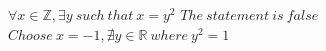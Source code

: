 \documentclass{article}
\begin{document}
$\forall x \in \mathbb{Z}, \exists y\ such\ that\ x = y^2$
$The\ statement\ is\ false$
$Choose\ x = -1, \nexists y \in \mathbb{R}\ where\ y^2 = 1$
\end{document}
